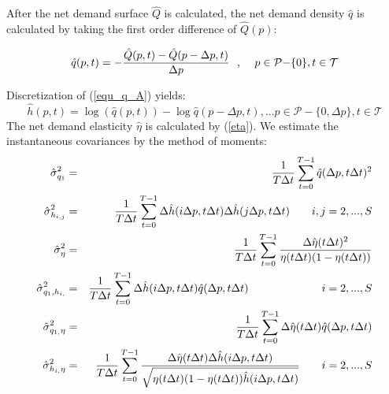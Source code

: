 \documentclass{article}
\begin{document}
After the net demand surface $\hat{Q}$ is calculated, the net demand density 
$\hat{q}$ is calculated by taking the first order difference of $\hat{Q}(p)$:

\begin{equation*}
\hat{q}(p,t)=-\frac{\hat{Q}(p,t)-\hat{Q}(p-\Delta p,t)}{\Delta p}\text{, \ \
\ }p\in \mathcal{P-}\{0\mathcal{\}},t\in \mathcal{T}
\end{equation*}

Discretization of (\ref{equ_q_A}) yields:%
\begin{equation*}
\hat{h}(p,t)=\log (\hat{q}(p,t))-\log {\hat{q}(p-\Delta p,t),...}p\in 
\mathcal{P-}\{0,\Delta p\mathcal{\}},t\in \mathcal{T}
\end{equation*}%
The net demand elasticity $\hat{\eta}$ is calculated by (\ref{eta}). We
estimate the instantaneous covariances by the method of moments: 
\begin{eqnarray*}
\hat{\sigma}_{q_{1}}^{2} &=&\frac{1}{T\Delta t}\sum_{t=0}^{T-1}\hat{q}%
(\Delta p,t\Delta t)^{2} \\
\hat{\sigma}_{h_{i,j}}^{2} &=&\frac{1}{T\Delta t}\sum_{t=0}^{T-1}\Delta \hat{%
h}(i\Delta p,t\Delta t)\Delta \hat{h}(j\Delta p,t\Delta t)\text{ \ \ \ }%
i,j=2,...,S \\
\hat{\sigma}_{\eta }^{2} &=&\frac{1}{T\Delta t}\sum_{t=0}^{T-1}\frac{\Delta 
\hat{\eta}(t\Delta t)^{2}}{\eta (t\Delta t)(1-\eta (t\Delta t))} \\
\hat{\sigma}_{q_{1},h_{i,}}^{2} &=&\frac{1}{T\Delta t}\sum_{t=0}^{T-1}\Delta 
\hat{h}(i\Delta p,t\Delta t)\hat{q}(\Delta p,t\Delta t)\text{ \ \ \ \ \ \ \
\ \ \ \ \ \ \ \ \ \ }i=2,...,S \\
\hat{\sigma}_{q_{1,}\eta }^{2} &=&\frac{1}{T\Delta t}\sum_{t=0}^{T-1}\Delta 
\hat{\eta}(t\Delta t)\hat{q}(\Delta p,t\Delta t) \\
\hat{\sigma}_{h_{i,}\eta }^{2} &=&\frac{1}{T\Delta t}\sum_{t=0}^{T-1}\frac{%
\Delta \hat{\eta}(t\Delta t)\Delta \hat{h}(i\Delta p,t\Delta t)}{\sqrt{\eta
(t\Delta t)(1-\eta (t\Delta t))\hat{h}(i\Delta p,t\Delta t)}}\text{ \ \ \ }%
i=2,...,S
\end{eqnarray*}
\end{document}
